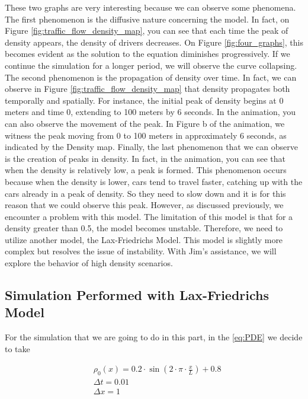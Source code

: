 \documentclass{article}
\begin{document}
	These two graphs are very interesting because we can observe some phenomena. The first phenomenon is the diffusive nature concerning the model. In fact, on Figure \ref{fig:traffic_flow_density_map}, you can see that each time the peak of density appears, the density of drivers decreases. On Figure \ref{fig:four_graphs}, this becomes evident as the solution to the equation diminishes progressively. If we continue the simulation for a longer period, we will observe the curve collapsing.
	\newline\newline
	The second phenomenon is the propagation of density over time. In fact, we can observe in Figure \ref{fig:traffic_flow_density_map} that density propagates both temporally and spatially. For instance, the initial peak of density begins at 0 meters and time 0, extending to 100 meters by 6 seconds. In the animation, you can also observe the movement of the peak. In Figure b of the animation, we witness the peak moving from 0 to 100 meters in approximately 6 seconds, as indicated by the Density map.
	\newline\newline
	Finally, the last phenomenon that we can observe is the creation of peaks in density. In fact, in the animation, you can see that when the density is relatively low, a peak is formed. This phenomenon occurs because when the density is lower, cars tend to travel faster, catching up with the cars already in a peak of density. So they need to slow down and it is for this reason that we could observe this peak.
	\newline\newline
	However, as discussed previously, we encounter a problem with this model. The limitation of this model is that for a density greater than 0.5, the model becomes unstable. Therefore, we need to utilize another model, the Lax-Friedrichs Model. This model is slightly more complex but resolves the issue of instability. With Jim's assistance, we will explore the behavior of high density scenarios.
	\subsection{Simulation Performed with Lax-Friedrichs Model}
	
		For the simulation that we are going to do in this part, in the \ref{eq:PDE} we decide to take 
	
	\[
	\boxed{
		\begin{aligned}
			&\rho_0(x)=0.2 \cdot \sin\left(2 \cdot \pi \cdot \frac{x}{L}\right) + 0.8 \\
			&\Delta t = 0.01 \\
			&\Delta x = 1
		\end{aligned}
	}
	\]
	
\end{document}
